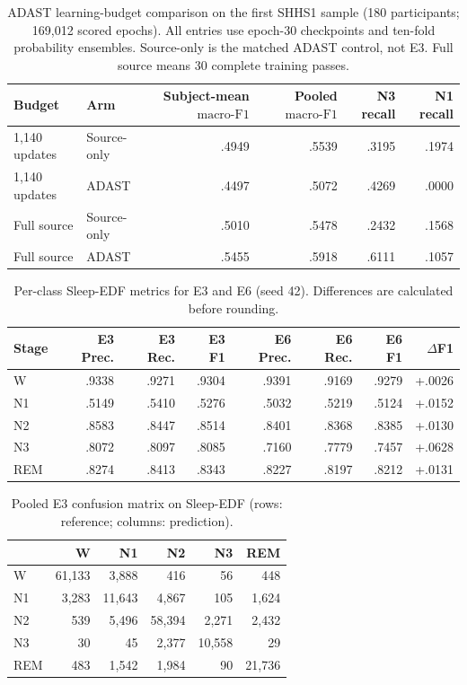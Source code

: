 \documentclass[10pt,a4paper]{article}
\newcommand{\mf}{\ensuremath{\mathrm{macro\text{-}F1}}}
\begin{document}
\begin{table}[H]
\centering\small
\caption{ADAST learning-budget comparison on the first SHHS1 sample (180 participants; 169{,}012
scored epochs). All entries use epoch-30 checkpoints and ten-fold probability ensembles. Source-only is
the matched ADAST control, not E3. Full source means 30 complete training passes.}
\label{tab:sup_adast_budget_first}
\begin{tabular}{llrrrr}
\toprule
Budget & Arm & Subject-mean \mf & Pooled \mf & N3 recall & N1 recall \\
\midrule
1,140 updates & Source-only & .4949 & .5539 & .3195 & .1974 \\
1,140 updates & ADAST & .4497 & .5072 & .4269 & .0000 \\
Full source & Source-only & .5010 & .5478 & .2432 & .1568 \\
Full source & ADAST & .5455 & .5918 & .6111 & .1057 \\
\bottomrule
\end{tabular}
\end{table}


\begin{table}[H]
\centering\small
\caption{Per-class Sleep-EDF metrics for E3 and E6 (seed 42). Differences are calculated before rounding.}
\label{tab:sup_edf_perclass}
\begin{tabular}{lrrrrrrr}
\toprule
Stage & E3 Prec. & E3 Rec. & E3 F1 & E6 Prec. & E6 Rec. & E6 F1 & $\Delta$F1 \\
\midrule
W & .9338 & .9271 & .9304 & .9391 & .9169 & .9279 & +.0026 \\
N1 & .5149 & .5410 & .5276 & .5032 & .5219 & .5124 & +.0152 \\
N2 & .8583 & .8447 & .8514 & .8401 & .8368 & .8385 & +.0130 \\
N3 & .8072 & .8097 & .8085 & .7160 & .7779 & .7457 & +.0628 \\
REM & .8274 & .8413 & .8343 & .8227 & .8197 & .8212 & +.0131 \\
\bottomrule
\end{tabular}
\end{table}

\begin{table}[H]
\centering\small
\caption{Pooled E3 confusion matrix on Sleep-EDF (rows: reference; columns: prediction).}
\label{tab:sup_edf_confusion}
\begin{tabular}{lrrrrr}
\toprule
 & W & N1 & N2 & N3 & REM \\
\midrule
W & 61{,}133 & 3{,}888 & 416 & 56 & 448 \\
N1 & 3{,}283 & 11{,}643 & 4{,}867 & 105 & 1{,}624 \\
N2 & 539 & 5{,}496 & 58{,}394 & 2{,}271 & 2{,}432 \\
N3 & 30 & 45 & 2{,}377 & 10{,}558 & 29 \\
REM & 483 & 1{,}542 & 1{,}984 & 90 & 21{,}736 \\
\bottomrule
\end{tabular}
\end{table}
\end{document}

